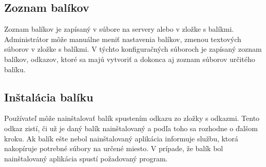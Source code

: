 \subsection{Zoznam balíkov}
Zoznam balíkov je zapísaný v súbore na servery alebo v zložke s balíkmi. Administrátor môže manuálne meniť nastavenia balíkov, zmenou textových súborov v zložke s balíkmi. V týchto konfiguračných súboroch je zapísaný zoznam balíkov, odkazov, ktoré sa majú vytvoriť a dokonca aj zoznam súborov určitého balíku.

\subsection{Inštalácia balíku}
Používateľ môže nainštalovať balík spustením odkazu zo zložky s odkazmi. Tento odkaz zistí, či už je daný balík nainštalovaný a podľa toho sa rozhodne o ďalšom kroku. Ak balík ešte nebol nainštalovaný aplikácia informuje službu, ktorá nakopíruje potrebné súbory na určené miesto. V prípade, že balík bol nainštalovaný aplikácia spustí požadovaný program.